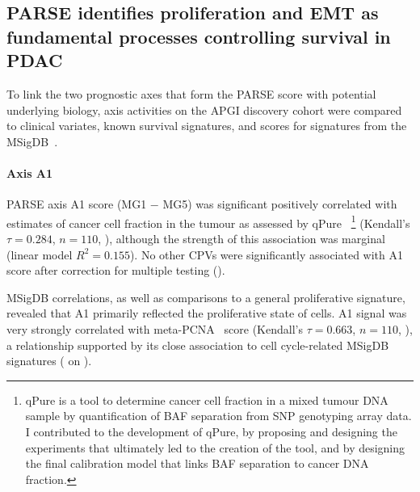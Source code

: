 \documentclass[dissertation.tex]{subfiles}
\begin{document}
\begin{figure}[!h]
\end{figure}


\subsection{\acrshort{PARSE} identifies proliferation and \acrshort{EMT} as fundamental processes controlling survival in \acrshort{PDAC}}
To link the two prognostic axes that form the \gls{PARSE} score with potential underlying biology, axis activities on the \gls{APGI} discovery cohort were compared to clinical variates, known survival signatures, and scores for signatures from the \gls{MSigDB}~\cite{Subramanian2005}.

\paragraph{Axis A1}
\gls{PARSE} axis A1 score (MG1 $-$ MG5) was significant positively correlated with estimates of cancer cell fraction in the tumour as assessed by qPure~\cite{Song2012} \footnote{qPure is a tool to determine cancer cell fraction in a mixed tumour DNA sample by quantification of \gls{BAF} separation from \gls{SNP} genotyping array data.  I contributed to the development of qPure, by proposing and designing the experiments that ultimately led to the creation of the tool, and by designing the final calibration model that links \gls{BAF} separation to cancer DNA fraction.} (Kendall's $\tau = 0.284$, $n = 110$, ), although the strength of this association was marginal (linear model $R^2 = 0.155$).  No other \glspl{CPV} were significantly associated with A1 score after correction for multiple testing ().

\gls{MSigDB} correlations, as well as comparisons to a general proliferative signature, revealed that A1 primarily reflected the proliferative state of cells.  A1 signal was very strongly correlated with meta-PCNA~\cite{Venet2011} score (Kendall's $\tau = 0.663$, $n = 110$, ), a relationship supported by its close association to cell cycle-related \gls{MSigDB} signatures ( on ).
\end{document}
